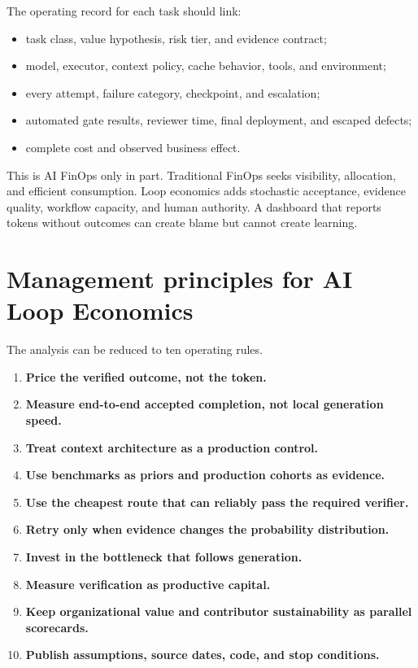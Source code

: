 \documentclass[11pt]{article}
\begin{document}
The operating record for each task should link:

\begin{itemize}
\item task class, value hypothesis, risk tier, and evidence contract;
\item model, executor, context policy, cache behavior, tools, and environment;
\item every attempt, failure category, checkpoint, and escalation;
\item automated gate results, reviewer time, final deployment, and escaped defects;
\item complete cost and observed business effect.
\end{itemize}

This is AI FinOps only in part. Traditional FinOps seeks visibility, allocation, and efficient consumption. Loop economics adds stochastic acceptance, evidence quality, workflow capacity, and human authority. A dashboard that reports tokens without outcomes can create blame but cannot create learning.

\section{Management principles for AI Loop Economics}

The analysis can be reduced to ten operating rules.

\begin{enumerate}
\item \textbf{Price the verified outcome, not the token.}
\item \textbf{Measure end-to-end accepted completion, not local generation speed.}
\item \textbf{Treat context architecture as a production control.}
\item \textbf{Use benchmarks as priors and production cohorts as evidence.}
\item \textbf{Use the cheapest route that can reliably pass the required verifier.}
\item \textbf{Retry only when evidence changes the probability distribution.}
\item \textbf{Invest in the bottleneck that follows generation.}
\item \textbf{Measure verification as productive capital.}
\item \textbf{Keep organizational value and contributor sustainability as parallel scorecards.}
\item \textbf{Publish assumptions, source dates, code, and stop conditions.}
\end{enumerate}
\end{document}
